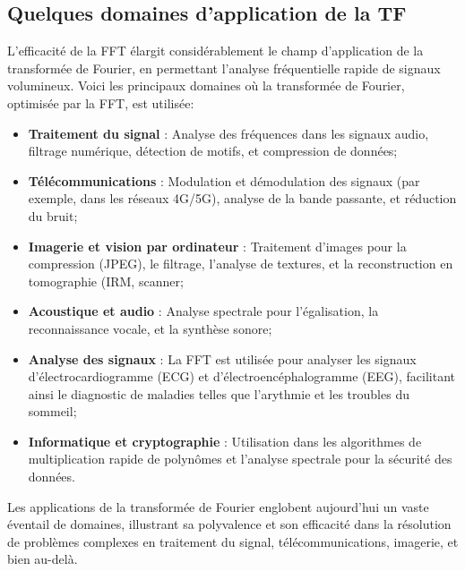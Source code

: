 \subsection{Quelques domaines d'application de la TF}
L'efficacité de la FFT élargit considérablement le champ d'application de la transformée de Fourier, en permettant l'analyse fréquentielle rapide de signaux volumineux. Voici les principaux domaines où la transformée de Fourier, optimisée par la FFT, est utilisée:
\begin{itemize}
    \item \textbf{Traitement du signal} : Analyse des fréquences dans les signaux audio, filtrage numérique, détection de motifs, et compression de données;
    \item \textbf{Télécommunications} : Modulation et démodulation des signaux (par exemple, dans les réseaux 4G/5G), analyse de la bande passante, et réduction du bruit;
    \item \textbf{Imagerie et vision par ordinateur} : Traitement d'images pour la compression (JPEG), le filtrage, l'analyse de textures, et la reconstruction en tomographie (IRM, scanner;
    \item \textbf{Acoustique et audio} : Analyse spectrale pour l'égalisation, la reconnaissance vocale, et la synthèse sonore;
    \item \textbf{Analyse des signaux} : La FFT est utilisée pour analyser les signaux d'électrocardiogramme (ECG) et d'électroencéphalogramme (EEG), facilitant ainsi le diagnostic de maladies telles que l'arythmie et les troubles du sommeil;
    \item \textbf{Informatique et cryptographie} : Utilisation dans les algorithmes de multiplication rapide de polynômes et l'analyse spectrale pour la sécurité des données.
\end{itemize}

Les applications de la transformée de Fourier englobent aujourd'hui un vaste éventail de domaines, illustrant sa polyvalence et son efficacité dans la résolution de problèmes complexes en traitement du signal, télécommunications, imagerie, et bien au-delà.



